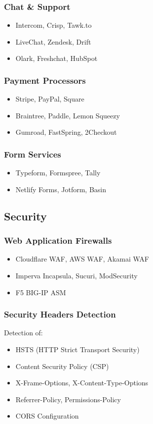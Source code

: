 \documentclass[11pt,a4paper,oneside]{article}
\begin{document}
\subsubsection{Chat \& Support}
\begin{itemize}
    \item Intercom, Crisp, Tawk.to
    \item LiveChat, Zendesk, Drift
    \item Olark, Freshchat, HubSpot
\end{itemize}

\subsubsection{Payment Processors}
\begin{itemize}
    \item Stripe, PayPal, Square
    \item Braintree, Paddle, Lemon Squeezy
    \item Gumroad, FastSpring, 2Checkout
\end{itemize}

\subsubsection{Form Services}
\begin{itemize}
    \item Typeform, Formspree, Tally
    \item Netlify Forms, Jotform, Basin
\end{itemize}

\subsection{Security}

\subsubsection{Web Application Firewalls}
\begin{itemize}
    \item Cloudflare WAF, AWS WAF, Akamai WAF
    \item Imperva Incapsula, Sucuri, ModSecurity
    \item F5 BIG-IP ASM
\end{itemize}

\subsubsection{Security Headers Detection}
Detection of:
\begin{itemize}
    \item HSTS (HTTP Strict Transport Security)
    \item Content Security Policy (CSP)
    \item X-Frame-Options, X-Content-Type-Options
    \item Referrer-Policy, Permissions-Policy
    \item CORS Configuration
\end{itemize}
\end{document}
